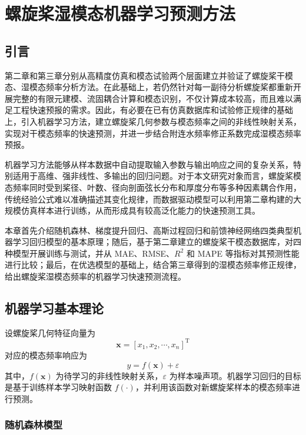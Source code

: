 \chapter{螺旋桨湿模态机器学习预测方法}

\section{引言}

第二章和第三章分别从高精度仿真和模态试验两个层面建立并验证了螺旋桨干模态、湿模态频率分析方法。在此基础上，若仍然针对每一副待分析螺旋桨都重新开展完整的有限元建模、流固耦合计算和模态识别，不仅计算成本较高，而且难以满足工程快速预报的需求。因此，有必要在已有仿真数据库和试验修正规律的基础上，引入机器学习方法，建立螺旋桨几何参数与模态频率之间的非线性映射关系，实现对干模态频率的快速预测，并进一步结合附连水频率修正系数完成湿模态频率预报。

机器学习方法能够从样本数据中自动提取输入参数与输出响应之间的复杂关系，特别适用于高维、强非线性、多输出的回归问题。对于本文研究对象而言，螺旋桨模态频率同时受到桨径、叶数、径向剖面弦长分布和厚度分布等多种因素耦合作用，传统经验公式难以准确描述其变化规律，而数据驱动模型可以利用第二章构建的大规模仿真样本进行训练，从而形成具有较高泛化能力的快速预测工具。

本章首先介绍随机森林、梯度提升回归、高斯过程回归和前馈神经网络四类典型机器学习回归模型的基本原理；随后，基于第二章建立的螺旋桨干模态数据库，对四种模型开展训练与测试，并从 MAE、RMSE、$R^2$ 和 MAPE 等指标对其预测性能进行比较；最后，在优选模型的基础上，结合第三章得到的湿模态频率修正规律，给出螺旋桨湿模态频率的机器学习快速预测流程。

\section{机器学习基本理论}

设螺旋桨几何特征向量为
\begin{equation}
  \mathbf{x} = [x_1, x_2, \cdots, x_n]^{\mathrm{T}}
\end{equation}
对应的模态频率响应为
\begin{equation}
  y = f(\mathbf{x}) + \varepsilon
\end{equation}
其中，$f(\mathbf{x})$ 为待学习的非线性映射关系，$\varepsilon$ 为样本噪声项。机器学习回归的目标是基于训练样本学习映射函数 $f(\cdot)$，并利用该函数对新螺旋桨样本的模态频率进行预测。

\subsection{随机森林模型}

